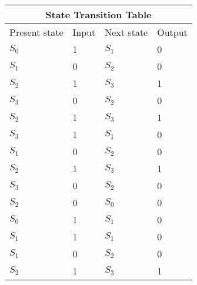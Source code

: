 
\setlength{\arrayrulewidth}{1mm}
\setlength{\tabcolsep}{18pt}
\renewcommand{\arraystretch}{1.5}


\begin{tabular}{ |p{1cm}|p{1cm}|p{1cm}|p{1cm}| }
\hline
\multicolumn{4}{|c|}{State Transition Table} \\
\hline
Present state & Input & Next state & Output  \\
\hline
 $S_0$ & 1 & $S_1$ &0 \\
\hline
$S_1$ & 0 & $S_2$  &0\\
\hline
$S_2$ & 1 & $S_3$  &1\\
\hline
$S_3$ & 0 & $S_2$  &0\\
\hline
$S_2$ & 1 & $S_3$  &1\\
\hline
$S_3$ & 1 & $S_1$  &0\\
\hline
$S_1$ & 0 & $S_2$  &0\\
\hline
$S_2$ & 1 & $S_3$  &1\\
\hline
$S_3$ & 0 & $S_2$  &0\\
\hline
$S_2$ & 0 & $S_0$  &0\\
\hline
$S_0$ & 1 & $S_1$  &0\\
\hline
$S_1$ & 1 & $S_1$  &0\\
\hline
$S_1$ & 0 & $S_2$  &0\\
\hline
$S_2$ & 1 & $S_3$  &1\\
\hline

\end{tabular}

